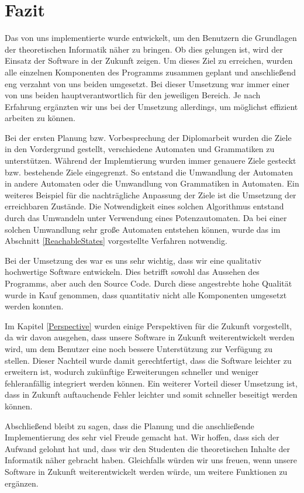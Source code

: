 

\chapter{Fazit}\label{Conclusion}

Das von uns implementierte \gtitool wurde entwickelt, um den Benutzern die
Grundlagen der theoretischen Informatik näher zu bringen. Ob dies gelungen ist,
wird der Einsatz der Software in der Zukunft zeigen. Um dieses Ziel zu erreichen,
wurden alle einzelnen Komponenten des Programms zusammen geplant und anschließend
eng verzahnt von uns beiden umgesetzt. Bei dieser Umsetzung war immer einer von
uns beiden hauptverantwortlich für den jeweiligen Bereich. Je nach Erfahrung
ergänzten wir uns bei der Umsetzung allerdings, um möglichst effizient arbeiten
zu können.\vspace{10pt}

Bei der ersten Planung bzw. Vorbesprechung der Diplomarbeit wurden die Ziele in
den Vordergrund gestellt, verschiedene Automaten und Grammatiken zu
unterstützen. Während der Implemtierung wurden immer genauere Ziele gesteckt
bzw. bestehende Ziele eingegrenzt. So entstand die Umwandlung der Automaten in
andere Automaten oder die Umwandlung von Grammatiken in Automaten. Ein weiteres
Beispiel für die nachträgliche Anpassung der Ziele ist die Umsetzung der
erreichbaren Zustände. Die Notwendigkeit eines solchen Algorithmus entstand
durch das Umwandeln unter Verwendung eines Potenzautomaten. Da bei einer
solchen Umwandlung sehr große Automaten entstehen können, wurde das im
Abschnitt \ref{ReachableStates} vorgestellte Verfahren notwendig.\vspace{10pt}

Bei der Umsetzung des \gtitools war es uns sehr wichtig, dass wir eine
qualitativ hochwertige Software entwickeln. Dies betrifft sowohl das
Aussehen des Programms, aber auch den Source Code. Durch diese angestrebte hohe
Qualität wurde in Kauf genommen, dass quantitativ nicht alle Komponenten
umgesetzt werden konnten.\vspace{10pt}

Im Kapitel \ref{Perspective} wurden einige Perspektiven für die Zukunft
vorgestellt, da wir davon ausgehen, dass unsere Software in Zukunft
weiterentwickelt werden wird, um dem Benutzer eine noch bessere Unterstützung zur
Verfügung zu stellen. Dieser Nachteil wurde damit gerechtfertigt, dass die
Software leichter zu erweitern ist, wodurch zukünftige Erweiterungen schneller
und weniger fehleranfällig integriert werden können. Ein weiterer Vorteil dieser
Umsetzung ist, dass in Zukunft auftauchende Fehler leichter und somit schneller
beseitigt werden können.\vspace{10pt}

Abschließend bleibt zu sagen, dass die Planung und die anschließende
Implementierung des \gtitools sehr viel Freude gemacht hat. Wir hoffen, dass sich
der Aufwand gelohnt hat und, dass wir den Studenten die theoretischen Inhalte der
Informatik näher gebracht haben. Gleichfalls würden wir uns freuen, wenn unsere
Software in Zukunft weiterentwickelt werden würde, um weitere Funktionen zu
ergänzen.\vspace{10pt}
